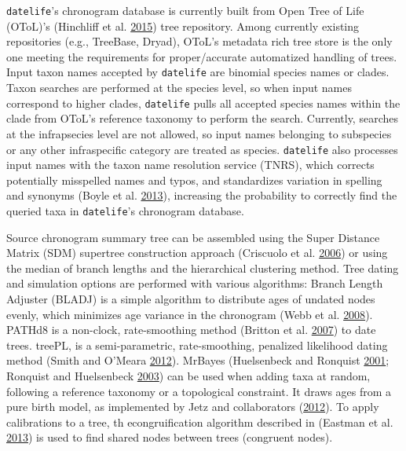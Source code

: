\documentclass[]{article}
\begin{document}
\texttt{datelife}'s chronogram database is currently built from Open Tree of Life (OToL)'s
(Hinchliff et al. \protect\hyperlink{ref-Hinchliff2015}{2015}) tree repository. Among currently existing repositories (e.g., TreeBase,
Dryad), OToL's metadata rich tree store is the only one meeting the requirements
for proper/accurate automatized handling of trees.
Input taxon names accepted by \texttt{datelife} are binomial species names or clades.
Taxon searches are performed at the species level, so when input names correspond
to higher clades,
\texttt{datelife} pulls all accepted species names within the
clade from OToL's reference taxonomy to perform the search.
Currently, searches at the infrapsecies level are not allowed, so input names belonging to subspecies or any other infraspecific category are treated
as species.
\texttt{datelife} also processes input names with the taxon name resolution service (TNRS),
which corrects potentially misspelled names and typos, and standardizes variation
in spelling and synonyms (Boyle et al. \protect\hyperlink{ref-Boyle2013}{2013}), increasing the probability to correctly find the
queried taxa in \texttt{datelife}'s chronogram database.

Source chronogram summary tree can be assembled using the Super Distance Matrix
(SDM) supertree construction approach (Criscuolo et al. \protect\hyperlink{ref-Criscuolo2006}{2006}) or using the median of branch
lengths and the hierarchical clustering method.
Tree dating and simulation options are performed with various algorithms:
Branch Length Adjuster (BLADJ) is a simple algorithm to distribute ages of undated
nodes evenly, which minimizes age variance in the chronogram (Webb et al. \protect\hyperlink{ref-Webb2008}{2008}).
PATHd8 is a non-clock, rate-smoothing method (Britton et al. \protect\hyperlink{ref-Britton2007}{2007}) to date trees.
treePL, is a semi-parametric, rate-smoothing, penalized likelihood dating method
(Smith and O'Meara \protect\hyperlink{ref-Smith2012}{2012}).
MrBayes (Huelsenbeck and Ronquist \protect\hyperlink{ref-Huelsenbeck2001}{2001}; Ronquist and Huelsenbeck \protect\hyperlink{ref-Ronquist2003}{2003}) can be used when adding taxa at
random, following a reference taxonomy or a topological constraint. It draws ages
from a pure birth model, as implemented by Jetz and collaborators (\protect\hyperlink{ref-Jetz2012}{2012}).
To apply calibrations to a tree, th econgruification algorithm described in (Eastman et al. \protect\hyperlink{ref-Eastman2013}{2013})
is used to find shared nodes between trees (congruent nodes).
\end{document}
